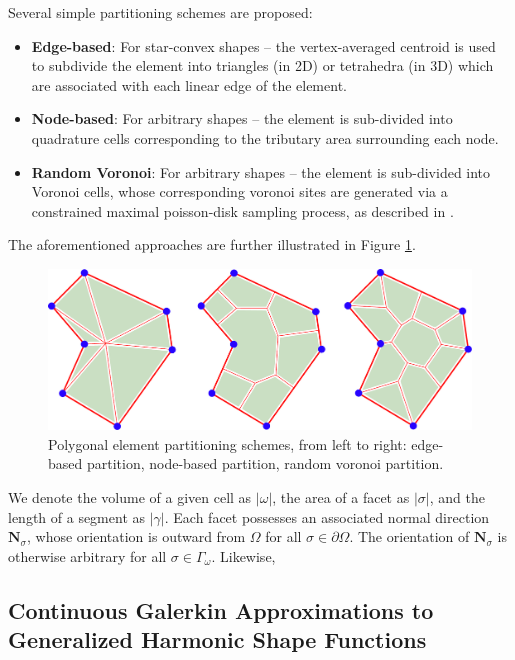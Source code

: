 	Several simple partitioning schemes are proposed:
	\begin{itemize}
		\item \textbf{Edge-based}: For star-convex shapes -- the vertex-averaged centroid is used to subdivide the element into triangles (in 2D) or tetrahedra (in 3D) which are associated with each linear edge of the element.
		\item \textbf{Node-based}: For arbitrary shapes -- the element is sub-divided into quadrature cells corresponding to the tributary area surrounding each node.
		\item \textbf{Random Voronoi}: For arbitrary shapes -- the element is sub-divided into Voronoi cells, whose corresponding voronoi sites are generated via a constrained maximal poisson-disk sampling process, as described in \cite{Ebeida:11}.
	\end{itemize}
	The aforementioned approaches are further illustrated in Figure \ref{fig:partitioning_types}.
	\begin{figure} [!ht]
		\centering
		\includegraphics[width = 6.0in]{figures/partition_types.pdf}
		\caption{Polygonal element partitioning schemes, from left to right: edge-based partition, node-based partition, random voronoi partition.}
		\label{fig:partitioning_types}
	\end{figure}
	
	We denote the volume of a given cell as $|\omega|$, the area of a facet as $|\sigma|$, and the length of a segment as $|\gamma|$. Each facet possesses an associated normal direction $\mathbf{N}_\sigma$, whose orientation is outward from $\Omega$ for all $\sigma \in \partial \Omega$. The orientation of $\mathbf{N}_\sigma$ is otherwise arbitrary for all $\sigma \in \Gamma_\omega$. Likewise, 
	
\subsection*{Continuous Galerkin Approximations to \\ Generalized Harmonic Shape Functions}

